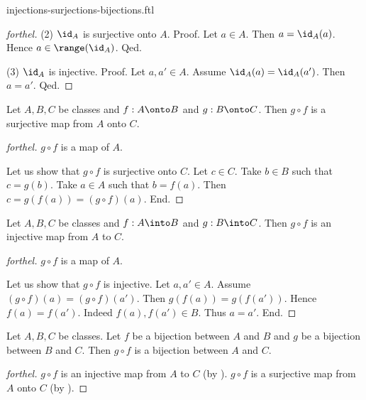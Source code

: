 \documentclass{naproche-library}
\begin{document}
\begin{smodule}{injections-surjections-bijections.ftl}
\begin{proof}[forthel]
    (2) $\id_{A}$ is surjective onto $A$. \newline
    Proof.
      Let $a \in A$.
      Then $a = \id_{A}(a)$.
      Hence $a \in \range(\id_{A})$.
    Qed.

    (3) $\id_{A}$ is injective. \newline
    Proof.
      Let $a, a' \in A$.
      Assume $\id_{A}(a) = \id_{A}(a')$.
      Then $a = a'$.
    Qed.
  \end{proof}

  \begin{proposition}[forthel,id=FOUNDATIONS_08_8542698338254848]
    Let $A, B, C$ be classes and $f : A \onto B$ and $g : B \onto C$.
    Then $g \circ f$ is a surjective map from $A$ onto $C$.
  \end{proposition}
  \begin{proof}[forthel]
    $g \circ f$ is a map of $A$.

    Let us show that $g \circ f$ is surjective onto $C$.
      Let $c \in C$.
      Take $b \in B$ such that $c = g(b)$.
      Take $a \in A$ such that $b = f(a)$.
      Then $c = g(f(a)) = (g \circ f)(a)$.
    End.
  \end{proof}

  \begin{proposition}[forthel,id=FOUNDATIONS_08_3367836856614912]
    Let $A, B, C$ be classes and $f : A \into B$ and $g : B \into C$.
    Then $g \circ f$ is an injective map from $A$ to $C$.
  \end{proposition}
  \begin{proof}[forthel]
    $g \circ f$ is a map of $A$.

    Let us show that $g \circ f$ is injective.
      Let $a, a' \in A$.
      Assume $(g \circ f)(a) = (g \circ f)(a')$.
      Then $g(f(a)) = g(f(a'))$.
      Hence $f(a) = f(a')$.
      Indeed $f(a), f(a') \in B$.
      Thus $a = a'$.
    End.
  \end{proof}

  \begin{corollary}[forthel,id=FOUNDATIONS_08_6435206693126144]
    Let $A, B, C$ be classes.
    Let $f$ be a bijection between $A$ and $B$ and $g$ be a bijection between $B$ and $C$.
    Then $g \circ f$ is a bijection between $A$ and $C$.
  \end{corollary}
  \begin{proof}[forthel]
    $g \circ f$ is an injective map from $A$ to $C$ (by ).
    $g \circ f$ is a surjective map from $A$ onto $C$ (by ).
  \end{proof}


\end{smodule}
\end{document}

